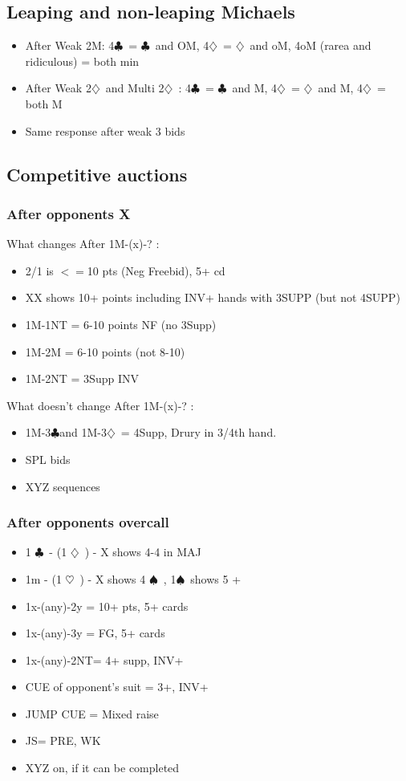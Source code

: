 \documentclass{article}
\newcommand\C{\ensuremath{\clubsuit}}
\newcommand\D{\ensuremath{\diamondsuit}}
\renewcommand\H{\ensuremath{\heartsuit}}
\renewcommand\S{\ensuremath{\spadesuit}}
\begin{document}
\begin{multicols}{2}
 \subsection{Leaping and non-leaping Michaels }
 \label{leaping}
 \begin{itemize}
   \item After Weak 2M: 4\C\ = \C\ and OM, 4\D\ = \D\ and oM, 4oM (rarea and ridiculous) = both min
   \item After Weak 2\D\ and Multi 2\D\ : 4\C\ = \C\ and M, 4\D\ = \D\ and M, 4\D\ = both M
   \item  Same response after weak 3 bids
 \end{itemize}
  \subsection{Competitive auctions}
  \label{comp}
  \subsubsection{After opponents X}
  What changes After 1M-(x)-?  :
  \begin{itemize}
    \item 2/1 is $<=$10 pts (Neg Freebid), 5+ cd
    \item XX shows 10+ points including INV+ hands with 3SUPP (but not 4SUPP)
    \item 1M-1NT = 6-10 points NF (no 3Supp)
    \item 1M-2M = 6-10 points (not 8-10)
    \item 1M-2NT = 3Supp INV
  \end{itemize}
  What doesn't change After 1M-(x)-?  :
  \begin{itemize}
    \item  1M-3\C and 1M-3\D\ = 4Supp, Drury in 3/4th hand. 
    \item SPL bids
    \item XYZ sequences
  \end{itemize}
  \subsubsection{After opponents overcall}
  \begin{itemize}
    \item 1 \C\ - (1 \D\ ) - X shows 4-4 in MAJ 
    \item 1m - (1 \H\ ) - X shows 4 \S\ , 1\S\  shows 5 +
    \item 1x-(any)-2y = 10+ pts, 5+  cards
    \item 1x-(any)-3y = FG, 5+  cards
    \item 1x-(any)-2NT= 4+ supp, INV+
    \item CUE of opponent's suit = 3+, INV+
    \item JUMP CUE = Mixed raise
    \item JS= PRE, WK
    \item XYZ on, if it can be completed
  \end{itemize}

\end{multicols}
\end{document}
